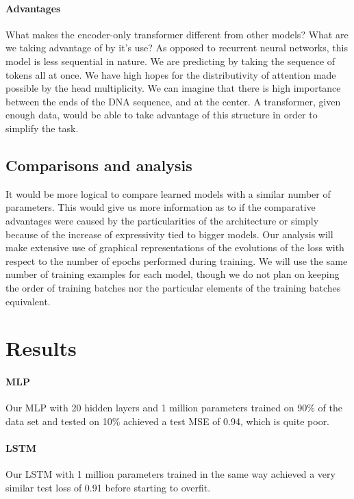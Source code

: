 \documentclass{article}
\begin{document}
\paragraph{Advantages}
What makes the encoder-only transformer different from other models? What are
we taking advantage of by it's use? As opposed to recurrent neural networks, 
this model is less sequential in nature. We are predicting by 
taking the sequence of tokens all at once. We have high hopes for the 
distributivity of attention made possible by the head multiplicity.
We can imagine that there is high importance between the ends of the DNA 
sequence, and at the center. A transformer, given enough data, would 
be able to take advantage of this structure in order to simplify the task.


\subsection{Comparisons and analysis}
It would be more logical to compare learned models with a similar 
number of parameters. This would give us more information as 
to if the comparative advantages were caused by the particularities 
of the architecture or simply because of the increase of expressivity 
tied to bigger models. Our analysis will make extensive use of graphical 
representations of the evolutions of the loss with respect to the number 
of epochs performed during training. We will use the same number 
of training examples for each model, though we do not plan on keeping 
the order of training batches nor the particular elements of the training 
batches equivalent.

\section{Results}

\paragraph{MLP} Our MLP with 20 hidden layers and 1 million parameters trained on 90\% of the data set and tested on 10\% achieved a test MSE of 0.94, which is quite poor.

\paragraph{LSTM} Our LSTM with 1 million parameters trained in the same way achieved a very similar test loss of 0.91 before starting to overfit.
\end{document}
